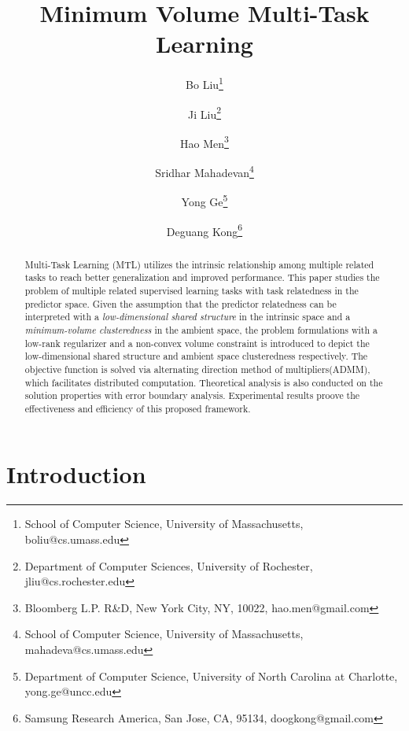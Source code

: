 \documentclass[twoside,leqno,twocolumn]{article}
\begin{document}

\title{\Large Minimum Volume Multi-Task Learning}
\author{Bo Liu\thanks{School of Computer Science, University of Massachusetts, boliu@cs.umass.edu}
\and
Ji Liu\thanks{Department of Computer Sciences, University of Rochester, jliu@cs.rochester.edu}
\and
Hao Men\thanks{Bloomberg L.P. R\&D, New York City, NY, 10022, hao.men@gmail.com}
\and
Sridhar Mahadevan\thanks{School of Computer Science, University of Massachusetts, mahadeva@cs.umass.edu}
\and
Yong Ge\thanks{Department of Computer Science, University of North Carolina at Charlotte, yong.ge@uncc.edu}
\and
Deguang Kong\thanks{Samsung Research America, San Jose, CA, 95134, doogkong@gmail.com}
}
\date{}

\maketitle

 

\begin{abstract} \small\baselineskip=9pt 

Multi-Task Learning (MTL) utilizes the intrinsic relationship among
multiple related tasks to reach better generalization and improved
performance. This paper studies the problem of multiple related
supervised learning tasks with task relatedness in the predictor space.
Given the assumption that the predictor relatedness can be interpreted with a
\emph{low-dimensional shared structure} in the intrinsic space
and a \emph{minimum-volume clusteredness} in the ambient space, the problem
formulations with a low-rank regularizer and a non-convex volume constraint
is introduced to depict the low-dimensional shared structure and ambient space
clusteredness respectively. The objective function is solved via alternating
direction method of multipliers(ADMM), which facilitates distributed computation.
Theoretical analysis is also conducted on the solution properties with error boundary
 analysis. Experimental results proove the effectiveness and efficiency of
this proposed framework.

\end{abstract}



\section{Introduction}
\end{document}
